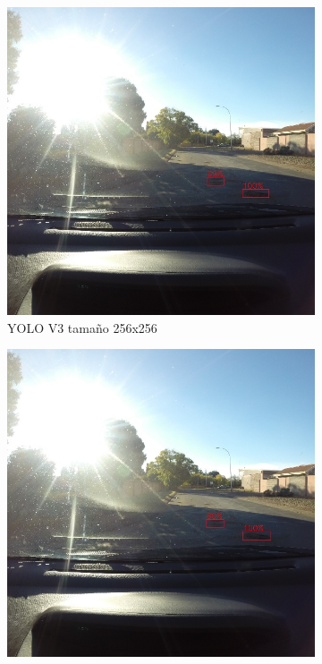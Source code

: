 \begin{figure}[H]
\begin{subfigure}[h]{0.45\linewidth}
		\includegraphics[width=\linewidth]{images/results_d_yolo_v3_256.jpg}
		\caption{YOLO V3 tamaño 256x256}
	\end{subfigure}
	\begin{subfigure}[h]{0.45\linewidth}
		\includegraphics[width=\linewidth]{images/results_d_yolo_v3_416.jpg}

\end{subfigure}
\end{figure}
